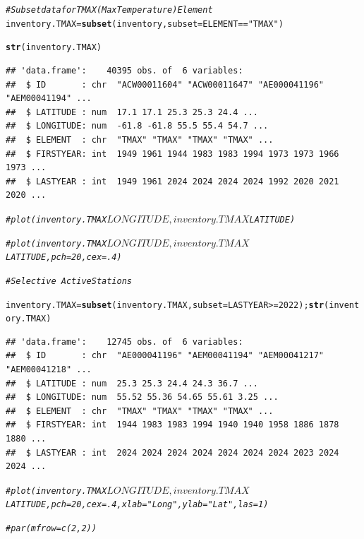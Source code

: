 \documentclass{article}\usepackage[]{graphicx}\usepackage[]{xcolor}
\makeatletter
\newcommand{\hlnum}[1]{\textcolor[rgb]{0.686,0.059,0.569}{#1}}%
\newcommand{\hlstr}[1]{\textcolor[rgb]{0.192,0.494,0.8}{#1}}%
\newcommand{\hlcom}[1]{\textcolor[rgb]{0.678,0.584,0.686}{\textit{#1}}}%
\newcommand{\hlopt}[1]{\textcolor[rgb]{0,0,0}{#1}}%
\newcommand{\hlstd}[1]{\textcolor[rgb]{0.345,0.345,0.345}{#1}}%
\newcommand{\hlkwb}[1]{\textcolor[rgb]{0.69,0.353,0.396}{#1}}%
\newcommand{\hlkwc}[1]{\textcolor[rgb]{0.333,0.667,0.333}{#1}}%
\newcommand{\hlkwd}[1]{\textcolor[rgb]{0.737,0.353,0.396}{\textbf{#1}}}%
\newenvironment{kframe}{%
 \def\at@end@of@kframe{}%
 \ifinner\ifhmode%
  \def\at@end@of@kframe{\end{minipage}}%
  \begin{minipage}{\columnwidth}%
 \fi\fi%
 \def\FrameCommand##1{\hskip\@totalleftmargin \hskip-\fboxsep
 \colorbox{shadecolor}{##1}\hskip-\fboxsep
     \hskip-\linewidth \hskip-\@totalleftmargin \hskip\columnwidth}%
 \MakeFramed {\advance\hsize-\width
   \@totalleftmargin\z@ \linewidth\hsize
   \@setminipage}}%
 {\par\unskip\endMakeFramed%
 \at@end@of@kframe}
\newenvironment{knitrout}{}{} %
\makeatother
\begin{document}
\begin{knitrout}
\color{fgcolor}\begin{kframe}
\begin{alltt}
\hlcom{# Subset data for TMAX  (Max Temperature) Element}
\hlstd{inventory.TMAX} \hlkwb{=} \hlkwd{subset}\hlstd{(inventory,} \hlkwc{subset}\hlstd{=ELEMENT}\hlopt{==}\hlstr{"TMAX"}\hlstd{)}

\hlkwd{str}\hlstd{(inventory.TMAX)}
\end{alltt}
\begin{verbatim}
## 'data.frame':	40395 obs. of  6 variables:
##  $ ID       : chr  "ACW00011604" "ACW00011647" "AE000041196" "AEM00041194" ...
##  $ LATITUDE : num  17.1 17.1 25.3 25.3 24.4 ...
##  $ LONGITUDE: num  -61.8 -61.8 55.5 55.4 54.7 ...
##  $ ELEMENT  : chr  "TMAX" "TMAX" "TMAX" "TMAX" ...
##  $ FIRSTYEAR: int  1949 1961 1944 1983 1983 1994 1973 1973 1966 1973 ...
##  $ LASTYEAR : int  1949 1961 2024 2024 2024 2024 1992 2020 2021 2020 ...
\end{verbatim}
\begin{alltt}
\hlcom{#plot(inventory.TMAX$LONGITUDE, inventory.TMAX$LATITUDE)}

\hlcom{#plot(inventory.TMAX$LONGITUDE, inventory.TMAX$LATITUDE, pch=20, cex=.4)}

\hlcom{# Selective ~Active Stations}

\hlstd{inventory.TMAX} \hlkwb{=} \hlkwd{subset}\hlstd{(inventory.TMAX,} \hlkwc{subset}\hlstd{=LASTYEAR}\hlopt{>=}\hlnum{2022}\hlstd{);} \hlkwd{str}\hlstd{(inventory.TMAX)}
\end{alltt}
\begin{verbatim}
## 'data.frame':	12745 obs. of  6 variables:
##  $ ID       : chr  "AE000041196" "AEM00041194" "AEM00041217" "AEM00041218" ...
##  $ LATITUDE : num  25.3 25.3 24.4 24.3 36.7 ...
##  $ LONGITUDE: num  55.52 55.36 54.65 55.61 3.25 ...
##  $ ELEMENT  : chr  "TMAX" "TMAX" "TMAX" "TMAX" ...
##  $ FIRSTYEAR: int  1944 1983 1983 1994 1940 1940 1958 1886 1878 1880 ...
##  $ LASTYEAR : int  2024 2024 2024 2024 2024 2024 2024 2023 2024 2024 ...
\end{verbatim}
\begin{alltt}
\hlcom{#plot(inventory.TMAX$LONGITUDE, inventory.TMAX$LATITUDE, pch=20, cex=.4, xlab="Long", ylab="Lat", las=1)}

\hlcom{#par(mfrow=c(2,2))}
\end{alltt}
\end{kframe}
\end{knitrout}
\end{document}
